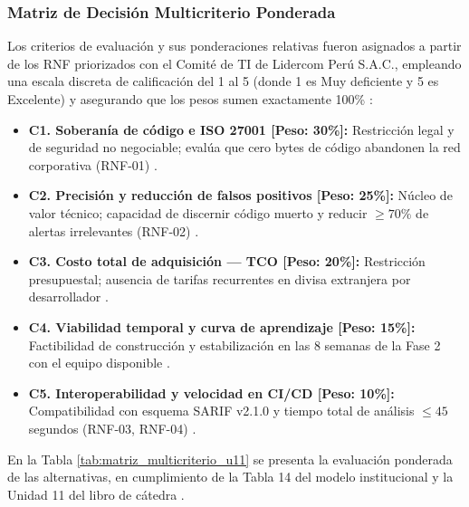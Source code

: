 \subsubsection{Matriz de Decisión Multicriterio Ponderada}
Los criterios de evaluación y sus ponderaciones relativas fueron asignados a partir de los RNF priorizados con el Comité de TI de Lidercom Perú S.A.C., empleando una escala discreta de calificación del 1 al 5 (donde 1 es Muy deficiente y 5 es Excelente) y asegurando que los pesos sumen exactamente 100\% \parencite{kendall2019systems, torres2026proyecto}: %
\begin{itemize}[leftmargin=1.27cm]
    \item \textbf{C1. Soberanía de código e ISO 27001 [Peso: 30\%]:} Restricción legal y de seguridad no negociable; evalúa que cero bytes de código abandonen la red corporativa (RNF-01) \parencite{ladisa2023sok}. %
    \item \textbf{C2. Precisión y reducción de falsos positivos [Peso: 25\%]:} Núcleo de valor técnico; capacidad de discernir código muerto y reducir $\ge 70\%$ de alertas irrelevantes (RNF-02) \parencite{pashchenko2022vuln4real}. %
    \item \textbf{C3. Costo total de adquisición --- TCO [Peso: 20\%]:} Restricción presupuestal; ausencia de tarifas recurrentes en divisa extranjera por desarrollador \parencite{gutierrez2024auditoria}. %
    \item \textbf{C4. Viabilidad temporal y curva de aprendizaje [Peso: 15\%]:} Factibilidad de construcción y estabilización en las 8 semanas de la Fase 2 con el equipo disponible \parencite{torres2026proyecto}. %
    \item \textbf{C5. Interoperabilidad y velocidad en CI/CD [Peso: 10\%]:} Compatibilidad con esquema SARIF v2.1.0 y tiempo total de análisis $\le 45$ segundos (RNF-03, RNF-04) \parencite{oasis2019sarif}. %
\end{itemize}

En la Tabla \ref{tab:matriz_multicriterio_u11} se presenta la evaluación ponderada de las alternativas, en cumplimiento de la Tabla 14 del modelo institucional y la Unidad 11 del libro de cátedra \parencite{torres2026proyecto}. %

